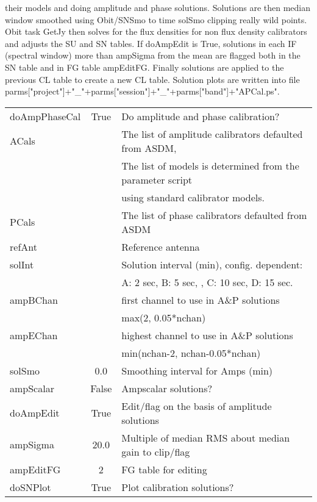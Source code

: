 \documentclass[11pt]{article}
\begin{document}
\begin{enumerate}
their models and doing amplitude and phase solutions.
Solutions are then median window smoothed using Obit/SNSmo to time
solSmo clipping really wild points.
Obit task GetJy then solves for the flux densities for non flux
density calibrators and adjusts the SU and SN tables. If doAmpEdit is
True, solutions in each IF (spectral window) more than ampSigma from
the mean are flagged both in the SN table and in FG table ampEditFG.
Finally solutions are applied to the previous CL table to create a new
CL table.
Solution plots are written into file\\
parms["project"]+"\_"+parms["session"]+"\_"+parms["band"]+"APCal.ps".
\begin{center}
\begin{tabular}{|l|c|l|}
\hline
doAmpPhaseCal  & True & Do amplitude and phase calibration? \\
ACals  &  & The list of amplitude calibrators defaulted from ASDM, \\
  &  & The list of models is determined from the parameter script \\
  & & using standard calibrator models. \\
PCals  &  &  The list of phase calibrators defaulted from ASDM\\
refAnt  &  & Reference antenna \\
solInt  &  &  Solution interval (min), config. dependent:\\
  &  & A: 2 sec, B: 5 sec, , C:  10 sec, D: 15 sec.\\
ampBChan  &  & first channel to use in A\&P solutions \\
  &  &   max(2, 0.05*nchan)\\
ampEChan  &  &  highest channel to use in A\&P solutions\\
  &  &  min(nchan-2, nchan-0.05*nchan)\\
solSmo  & 0.0 &  Smoothing interval for Amps (min)\\
ampScalar  & False &  Ampscalar solutions?\\
doAmpEdit  & True  & Edit/flag on the basis of amplitude solutions \\
ampSigma  & 20.0 &  Multiple of median RMS about median gain to clip/flag\\
ampEditFG  & 2 &  FG table for editing \\
doSNPlot       & True &  Plot calibration solutions?\\
\hline
\end{tabular}
\end{center}

\end{enumerate}
\end{document}
